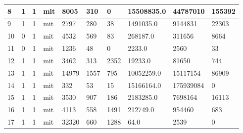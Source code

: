 \begin{landscape}
\begin{table}[h]
{\begin{tabular}{lcclllllll}
                8  & 1                          & 1                     & mit              & 8005             & 310                   & 0                            & 15508835.0      & 44787010           & 155392              \\ \hline
                9  & 1                          & 1                     & mit              & 2797             & 280                   & 38                           & 1491035.0       & 9144831            & 22303               \\ \hline
                10 & 0                          & 1                     & mit              & 4532             & 569                   & 83                           & 268187.0        & 311656             & 8664                \\ \hline
                11 & 0                          & 1                     & mit              & 1236             & 48                    & 0                            & 2233.0          & 2560               & 33                  \\ \hline
                12 & 1                          & 1                     & mit              & 3462             & 313                   & 2352                         & 19233.0         & 81650              & 744                 \\ \hline
                13 & 1                          & 1                     & mit              & 14979            & 1557                  & 795                          & 10052259.0      & 15117154           & 86909               \\ \hline
                14 & 1                          & 1                     & mit              & 332              & 53                    & 15                           & 15166164.0      & 175939084          & 0                   \\ \hline
                15 & 1                          & 1                     & mit              & 3530             & 907                   & 186                          & 2183285.0       & 7698164            & 16113               \\ \hline
                16 & 1                          & 1                     & mit              & 4113             & 558                   & 1491                         & 212749.0        & 954460             & 683                 \\ \hline
                17 & 1                          & 1                     & mit              & 32320            & 660                   & 1288                         & 64.0            & 2539               & 0                   \\ \hline

\end{tabular}}
\end{table}
\end{landscape}
